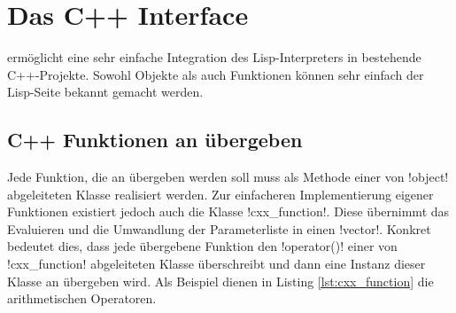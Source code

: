 \section{Das C++ Interface}
\label{sec:cxx_interface}

\projectname{} ermöglicht eine sehr einfache Integration des Lisp-Interpreters in bestehende C++-Projekte. Sowohl Objekte als auch Funktionen können sehr einfach der Lisp-Seite bekannt gemacht werden.

\subsection{C++ Funktionen an \projectname{} übergeben}
\label{sec:cxx_function_interface}

Jede Funktion, die an \projectname{} übergeben werden soll muss als Methode einer von !object! abgeleiteten Klasse realisiert werden. Zur einfacheren Implementierung eigener Funktionen existiert jedoch auch die Klasse !cxx_function!. Diese übernimmt das Evaluieren und die Umwandlung der Parameterliste in einen !vector!. Konkret bedeutet dies, dass jede übergebene Funktion den !operator()! einer von !cxx_function! abgeleiteten Klasse überschreibt und dann eine Instanz dieser Klasse an \projectname{} übergeben wird. Als Beispiel dienen in Listing \ref{lst:cxx_function} die arithmetischen Operatoren.
